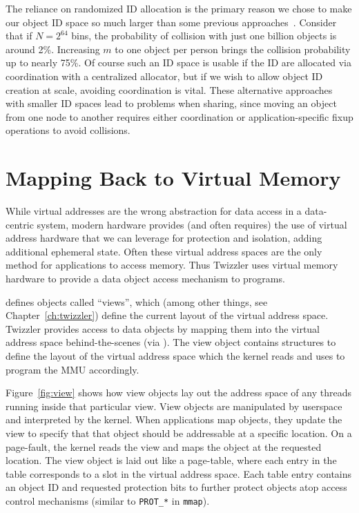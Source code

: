 The reliance on randomized ID allocation is the primary reason we chose to make our object ID space
so much larger than some previous approaches~\cite{pmdk,pmdk-pointers}. Consider that if $N = 2^{64}$
bins, the probability of collision with just one billion objects is around 2\%. Increasing $m$ to
one object per person brings the collision probability up to nearly 75\%. Of course such an ID space
is usable if the ID are allocated via coordination with a centralized allocator, but if
we wish to allow object ID creation at scale, avoiding coordination is vital. These alternative approaches with smaller ID spaces lead to problems when
sharing, since moving an object from one node to another requires either coordination or application-specific fixup
operations to avoid collisions.

\section{Mapping Back to Virtual Memory}



While virtual addresses are the wrong abstraction
for data access in a data-centric system, modern hardware provides (and often requires) the use of virtual address
hardware that we can leverage for protection and isolation, adding additional ephemeral state. Often these virtual
address spaces are the only method for applications to access memory. Thus Twizzler uses virtual memory hardware to
provide a data object access mechanism to programs.

\Twizzler defines objects called ``views'', which (among other things, see Chapter~\ref{ch:twizzler}) define the current
layout of the virtual address space. Twizzler
provides access to data objects by mapping them into the virtual address space
behind-the-scenes (via \libcore). The view object contains structures to define the layout of the
virtual address space which the kernel reads and uses to program the MMU accordingly.

Figure~\ref{fig:view} shows how view objects lay out the address space of any threads running inside
that particular view. View objects are manipulated by userspace and interpreted by the kernel. When
applications map objects, they update the view to specify that that object should be addressable at
a specific location. On a page-fault, the kernel reads the view and maps the object at the requested
location. The view object is laid out like a page-table, where each entry in the table corresponds
to a slot in the virtual address space. Each table entry contains an object ID and requested
protection bits to further protect objects atop access control mechanisms (similar to
\texttt{PROT\_*} in \texttt{mmap}).

